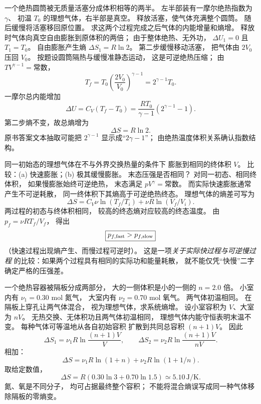 一个绝热圆筒被无质量活塞分成体积相等的两半。
左半部装有一摩尔绝热指数为 $\gamma$、
初温 $T_0$ 的理想气体，右半部是真空。
释放活塞，使气体充满整个圆筒。
随后缓慢将活塞移回原位置。
求这两个过程完成之后气体的内能增量和熵增。
\exsolution
释放时气体向真空自由膨胀到原体积的两倍；
由于整体绝热、无外功，
$\Delta U_1=0$ 且 $T_1=T_0$。
自由膨胀产生熵
$\Delta S_1=R\ln2$。
第二步缓慢移动活塞，
把气体由 $2V_0$ 压回 $V_0$。
按题设圆筒隔热与缓慢准静态运动，
这是可逆绝热压缩；
由 $TV^{\gamma-1}=\text{常数}$，
\[
T_f=T_0\left(\frac{2V_0}{V_0}\right)^{\gamma-1}
=2^{\gamma-1}T_0.
\]
一摩尔总内能增加
\[
\boxed{\Delta U=C_V(T_f-T_0)
=\frac{RT_0}{\gamma-1}(2^{\gamma-1}-1)}.
\]
第二步熵不变，故总熵增为
\[
\boxed{\Delta S=R\ln2}.
\]
\excheck 原书答案文本抽取可能把
$2^{\gamma-1}$ 显示成“$2\gamma-1$”；
由绝热温度体积关系确认指数结构。

同一初始态的理想气体在不与外界交换热量的条件下
膨胀到相同的终体积 $V$。
比较：(a) 快速膨胀；(b) 极其缓慢膨胀。
末态压强是否相同？
\exsolution
对同一初态、相同终体积，
如果慢膨胀始终可逆绝热，
末态满足 $pV^\gamma=\text{常数}$。
而实际快速膨胀通常产生不可逆耗散，
同一终体积下其熵高于可逆绝热终态。
理想气体的熵差可写为
\[
\Delta S=C_V\nu\ln(T_f/T_i)
+\nu R\ln(V_f/V_i).
\]
两过程的初态与终体积相同，
较高的终态熵对应较高的终态温度。
由 $p_f=\nu RT_f/V_f$，
得出
\[
\boxed{p_{f,\rm fast}>p_{f,\rm slow}}
\]
（快速过程出现熵产生、而慢过程可逆时）。
\excheck 这是一项\emph{关于实际快过程与可逆慢过程}
的比较：如果两个过程具有相同的实际功和能量耗散，
就不能仅凭“快慢”二字确定严格的压强差。

一个绝热容器被隔板分成两部分，
大的一侧体积是小的一侧的 $n=2.0$ 倍。
小室内有 $\nu_1=0.30$ mol 氮气，
大室内有 $\nu_2=0.70$ mol 氧气。
两气体初温相同。
在隔板上穿孔让两气体混合，
视为理想气体，求系统熵增。
\exsolution
设小室容积为 $V$、大室为 $nV$。
无热交换、无体积功且两气体初温相同，
理想气体内能守恒表明末温不变。
每种气体可等温地从各自初始容积
扩散到共同总容积 $(n+1)V$。
因此
\[
\Delta S_1=\nu_1R\ln\frac{(n+1)V}{V},\qquad
\Delta S_2=\nu_2R\ln\frac{(n+1)V}{nV}.
\]
相加：
\[
\boxed{\Delta S=
\nu_1R\ln(1+n)
+\nu_2R\ln(1+1/n)}.
\]
取给定数值，
\[
\boxed{\Delta S=R(0.30\ln3+0.70\ln1.5)
\simeq5.10\,\mathrm{J/K}}.
\]
\excheck 氮、氧是不同分子，
均可占据最终整个容积；
不能将混合熵误写成同一种气体移除隔板的零熵变。

